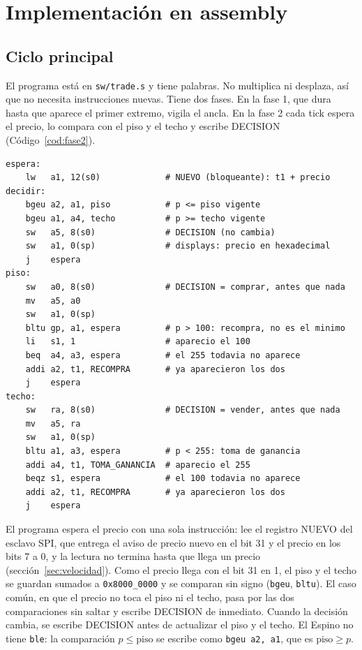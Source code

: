 \documentclass[11pt,letterpaper]{article}
\begin{document}
\section{Implementación en assembly}

\subsection{Ciclo principal}

El programa está en \texttt{sw/trade.s} y tiene \ExtPalabras{} palabras. No multiplica ni desplaza,
así que no necesita instrucciones nuevas. Tiene dos fases. En la fase 1, que dura hasta que aparece el
primer extremo, vigila el ancla. En la fase 2 cada tick espera el precio, lo compara con el piso y el
techo y escribe DECISION (Código~\ref{cod:fase2}).

\begin{lstlisting}[caption={Un tick de la fase 2 de \texttt{trade.s}.},label={cod:fase2}]
espera:
    lw   a1, 12(s0)             # NUEVO (bloqueante): t1 + precio
decidir:
    bgeu a2, a1, piso           # p <= piso vigente
    bgeu a1, a4, techo          # p >= techo vigente
    sw   a5, 8(s0)              # DECISION (no cambia)
    sw   a1, 0(sp)              # displays: precio en hexadecimal
    j    espera
piso:
    sw   a0, 8(s0)              # DECISION = comprar, antes que nada
    mv   a5, a0
    sw   a1, 0(sp)
    bltu gp, a1, espera         # p > 100: recompra, no es el minimo
    li   s1, 1                  # aparecio el 100
    beq  a4, a3, espera         # el 255 todavia no aparece
    addi a2, t1, RECOMPRA       # ya aparecieron los dos
    j    espera
techo:
    sw   ra, 8(s0)              # DECISION = vender, antes que nada
    mv   a5, ra
    sw   a1, 0(sp)
    bltu a1, a3, espera         # p < 255: toma de ganancia
    addi a4, t1, TOMA_GANANCIA  # aparecio el 255
    beqz s1, espera             # el 100 todavia no aparece
    addi a2, t1, RECOMPRA       # ya aparecieron los dos
    j    espera
\end{lstlisting}

El programa espera el precio con una sola instrucción: lee el registro NUEVO del esclavo SPI, que
entrega el aviso de precio nuevo en el bit 31 y el precio en los bits 7 a 0, y la lectura no termina
hasta que llega un precio (sección~\ref{sec:velocidad}). Como el precio llega con el bit 31 en 1, el
piso y el techo se guardan sumados a \texttt{0x8000\_0000} y se comparan sin signo (\texttt{bgeu},
\texttt{bltu}). El caso común, en que el precio no toca el piso ni el techo, pasa por las dos comparaciones
sin saltar y escribe DECISION de inmediato. Cuando la decisión cambia, se escribe DECISION antes de
actualizar el piso y el techo. El Espino no tiene \texttt{ble}: la comparación $p \le \text{piso}$ se
escribe como \texttt{bgeu a2, a1}, que es $\text{piso} \ge p$.
\end{document}
